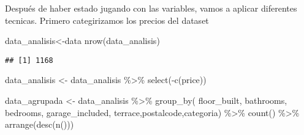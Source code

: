 \documentclass[
]{article}
\newenvironment{Shaded}{\begin{snugshade}}{\end{snugshade}}
\newcommand{\AttributeTok}[1]{\textcolor[rgb]{0.77,0.63,0.00}{#1}}
\newcommand{\ConstantTok}[1]{\textcolor[rgb]{0.00,0.00,0.00}{#1}}
\newcommand{\DecValTok}[1]{\textcolor[rgb]{0.00,0.00,0.81}{#1}}
\newcommand{\FunctionTok}[1]{\textcolor[rgb]{0.00,0.00,0.00}{#1}}
\newcommand{\NormalTok}[1]{#1}
\newcommand{\OtherTok}[1]{\textcolor[rgb]{0.56,0.35,0.01}{#1}}
\newcommand{\SpecialCharTok}[1]{\textcolor[rgb]{0.00,0.00,0.00}{#1}}
\newcommand{\StringTok}[1]{\textcolor[rgb]{0.31,0.60,0.02}{#1}}
\begin{document}
Después de haber estado jugando con las variables, vamos a aplicar
diferentes tecnicas. Primero categirizamos los precios del dataset

\begin{Shaded}
\begin{Highlighting}[]
\NormalTok{data\_analisis}\OtherTok{\textless{}{-}}\NormalTok{data}
\FunctionTok{nrow}\NormalTok{(data\_analisis)}
\end{Highlighting}
\end{Shaded}

\begin{verbatim}
## [1] 1168
\end{verbatim}

\begin{Shaded}
\end{Shaded}

\begin{Shaded}
\begin{Highlighting}[]
\NormalTok{data\_analisis }\OtherTok{\textless{}{-}}\NormalTok{ data\_analisis }\SpecialCharTok{\%\textgreater{}\%}
\FunctionTok{select}\NormalTok{(}\SpecialCharTok{{-}}\FunctionTok{c}\NormalTok{(price))}
\end{Highlighting}
\end{Shaded}

\begin{Shaded}
\begin{Highlighting}[]
\NormalTok{data\_agrupada }\OtherTok{\textless{}{-}}\NormalTok{ data\_analisis }\SpecialCharTok{\%\textgreater{}\%}
\FunctionTok{group\_by}\NormalTok{( floor\_built, bathrooms, bedrooms, garage\_included, terrace,postalcode,categoria) }\SpecialCharTok{\%\textgreater{}\%}
\FunctionTok{count}\NormalTok{() }\SpecialCharTok{\%\textgreater{}\%}
\FunctionTok{arrange}\NormalTok{(}\FunctionTok{desc}\NormalTok{(}\FunctionTok{n}\NormalTok{()))}
\end{Highlighting}
\end{Shaded}
\end{document}
